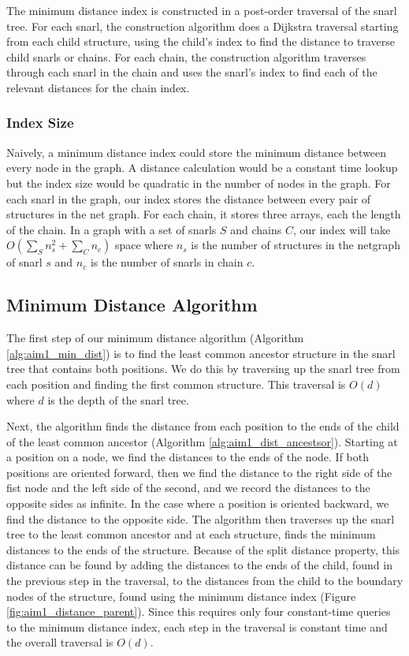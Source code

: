 \documentclass[11pt]{ucscthesis}
\begin{document}
The minimum distance index is constructed in a post-order traversal of the snarl tree.
For each snarl, the construction algorithm does a Dijkstra traversal starting from each child structure, using the child's index to find the distance to traverse child snarls or chains.
For each chain, the construction algorithm traverses through each snarl in the chain and uses the snarl's index to find each of the relevant distances for the chain index.

\subsubsection{Index Size}
Naively, a minimum distance index could store the minimum distance between every node in the graph.
A distance calculation would be a constant time lookup but the index size would be quadratic in the number of nodes in the graph.
For each snarl in the graph, our index stores the distance between every pair of structures in the net graph. For each chain, it stores three arrays, each the length of the chain. 
In a graph with a set of snarls $S$ and chains $C$, our index will take $O(\sum_Sn_s^2 + \sum_Cn_c)$ space where $n_s$ is the number of structures in the netgraph of snarl $s$ and $n_c$ is the number of snarls in chain $c$.


\subsection{Minimum Distance Algorithm}

The first step of our minimum distance algorithm (Algorithm \ref{alg:aim1_min_dist}) is to find the least common ancestor structure in the snarl tree that contains both positions. 
We do this by traversing up the snarl tree from each position and finding the first common structure.
This traversal is $O(d)$ where $d$ is the depth of the snarl tree.

Next, the algorithm finds the distance from each position to the ends of the child of the least common ancestor (Algorithm \ref{alg:aim1_dist_ancestsor}).
Starting at a position on a node, we find the distances to the ends of the node.
If both positions are oriented forward, then we find the distance to the right side of the fist node and the left side of the second, and we record the distances to the opposite sides as infinite.
In the case where a position is oriented backward, we find the distance to the opposite side.
The algorithm then traverses up the snarl tree to the least common ancestor and at each structure, finds the minimum distances to the ends of the structure.
Because of the split distance property, this distance can be found by adding the distances to the ends of the child, found in the previous step in the traversal, to the distances from the child to the boundary nodes of the structure, found using the minimum distance index (Figure \ref{fig:aim1_distance_parent}).
Since this requires only four constant-time queries to the minimum distance index, each step in the traversal is constant time and the overall traversal is $O(d)$.
\end{document}
